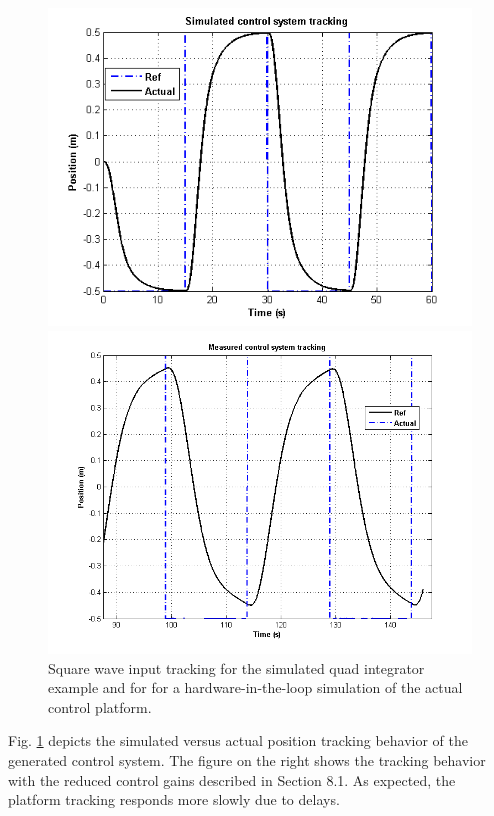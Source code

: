 \begin{figure}
\begin{minipage}[b]{0.5\linewidth}
\centering
\includegraphics[width=\columnwidth]{figures/tracking.png}
\end{minipage}
\hspace{0.5cm}
\begin{minipage}[b]{0.5\linewidth}
\centering
\includegraphics[width=\columnwidth]{figures/measpos.png}
\end{minipage}
   \caption{Square wave input tracking for the simulated quad integrator example and for 
for a hardware-in-the-loop simulation of the actual control platform. }
    \label{fig:exec}

\end{figure}

Fig. \ref{fig:exec} depicts the simulated versus actual position tracking behavior
of the generated control system.  The figure on the right shows the tracking behavior
with the reduced control gains described in Section 8.1.  As expected, the platform
tracking responds more slowly due to delays.
